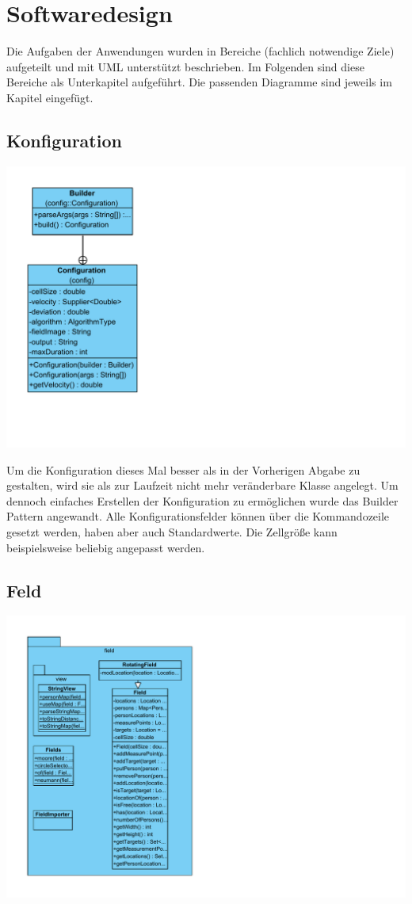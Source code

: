 \newpage
\section{Softwaredesign}

Die Aufgaben der Anwendungen wurden in Bereiche (fachlich notwendige Ziele) aufgeteilt und mit UML unterstützt beschrieben. Im Folgenden sind diese Bereiche als Unterkapitel aufgeführt. Die passenden Diagramme sind jeweils im Kapitel eingefügt.

\subsection{Konfiguration}

\includegraphics[width=\textwidth]{abbildungen/uml/config}

Um die Konfiguration dieses Mal besser als in der Vorherigen Abgabe zu gestalten, wird sie als zur Laufzeit nicht mehr veränderbare Klasse angelegt. Um dennoch einfaches Erstellen der Konfiguration zu ermöglichen wurde das Builder Pattern angewandt. Alle Konfigurationsfelder können über die Kommandozeile gesetzt  werden, haben aber auch Standardwerte. Die Zellgröße kann beispielsweise beliebig angepasst werden.

\subsection{Feld}

\includegraphics[width=\textwidth]{abbildungen/uml/field}

